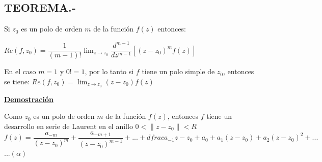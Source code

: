 \documentclass[10pt,a4paper]{article}
\begin{document}
\subsection{TEOREMA.-}
Si $z_0$ es un polo de orden $m$ de la función $f(z)$ entonces: \\
\begin{center}
$\displaystyle{Re(f,z_0) = \dfrac{1}{(m-1)!} \lim_{z \to z_0} \dfrac{d^{m-1}}{dz^{m-1}}[(z-z_0)^m f(z)]}$
\end{center}
En el caso $m = 1$ y $0! = 1$, por lo tanto si $f$ tiene un polo simple de $z_0$, entonces se tiene: $\displaystyle{Re(f,z_0) = \lim_{z \to z_0}(z-z_0) f(z)}$
\begin{center}
\textbf{\underline{Demostración}}
\end{center}
Como $z_0$ es un polo de orden $m$ de la función $f(z)$, entonces $f$ tiene un desarrollo en serie de Laurent en el anillo $0 < \parallel z - z_0 \parallel < R $\\
$\displaystyle{f(z) = \dfrac{a_{-m}}{(z-z_0)^m} + \dfrac{a_{-m+1}}{(z-z_0)^{m-1}} + ... + dfrac{a_{-1}}{z-z_0} + a_0 + a_1(z-z_0) + a_2 (z-z_0)^2 + ...  }$   $... (\alpha)$
\end{document}
